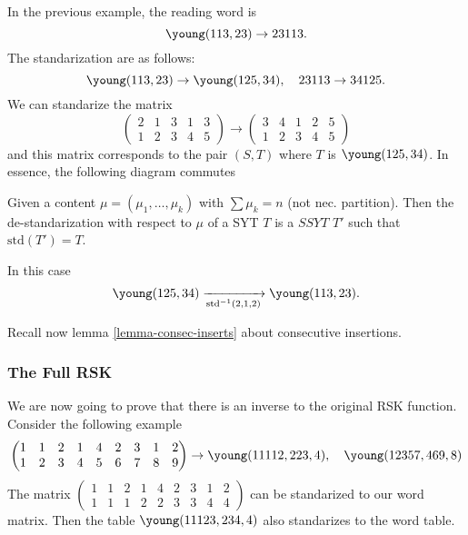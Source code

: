 \documentclass[12pt]{memoir}
\begin{document}
In the previous example, the reading word is 
$$\young(113,23)\to 23113.$$
The standarization are as follows:
$$\young(113,23)\to \young(125,34),\quad 23113\to34125.$$
We can standarize the matrix 
$$\begin{pmatrix}
    2&1&3&1&3\\1&2&3&4&5
\end{pmatrix}\to\begin{pmatrix}
    3&4&1&2&5\\1&2&3&4&5
\end{pmatrix}$$
and this matrix corresponds to the pair $(S,T)$ where $T$ is $\young(125,34)$. In essence, the following diagram commutes
\begin{figure}[h]
    \centering
\end{figure}

\begin{Def}
    Given a content $\mu=(\mu_1,\dots,\mu_k)$ with $\sum\mu_k=n$ (not nec. partition). Then the de-standarization with respect to $\mu$ of a SYT $T$ is a $SSYT$ $T'$ such that $\text{std}(T')=T$.
\end{Def}

In this case 
$$\young(125,34)\xrightarrow[\text{std}^{-1}(2,1,2)]{}\young(113,23).$$

Recall now lemma \ref{lemma-consec-inserts} about consecutive insertions.

\subsubsection{The Full RSK}

We are now going to prove that there is an inverse to the original RSK function. Consider the following example 
$$\begin{pmatrix}
    1&1&2&1&4&2&3&1&2\\
    1&2&3&4&5&6&7&8&9
\end{pmatrix}\to \young(11112,223,4),\quad \young(12357,469,8)$$
The matrix $\begin{pmatrix}
    1&1&2&1&4&2&3&1&2\\
    1&1&1&2&2&3&3&4&4
\end{pmatrix}$
can be standarized to our word matrix. Then the table $\young(11123,234,4)$ also standarizes to the word table. 
\end{document}

